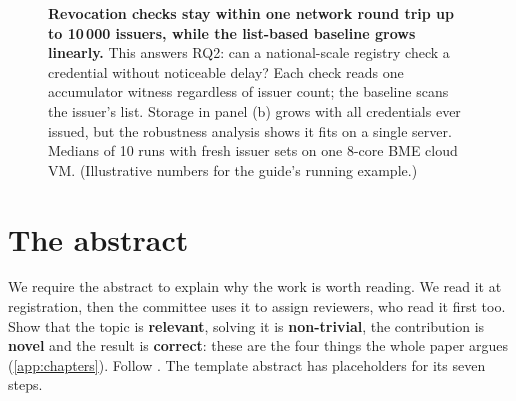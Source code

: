 \begin{figure}[!ht]
  \centering
  \caption{\textbf{Revocation checks stay within one network round trip up to 10\,000 issuers, while the list-based baseline grows linearly.} This answers RQ2: can a national-scale registry check a credential without noticeable delay? Each check reads one accumulator witness regardless of issuer count; the baseline scans the issuer's list. Storage in panel (b) grows with all credentials ever issued, but the robustness analysis shows it fits on a single server. Medians of 10 runs with fresh issuer sets on one 8-core BME cloud VM. (Illustrative numbers for the guide's running example.)}\label{fig:caption-example}
\end{figure}

\section{The abstract}\label{app:writing:abstract}
We require the abstract to explain why the work is worth reading. We read it at registration, then the committee uses it to assign reviewers, who read it first too. Show that the topic is \textbf{relevant}, solving it is \textbf{non-trivial}, the contribution is \textbf{novel} and the result is \textbf{correct}: these are the four things the whole paper argues (\cref{app:chapters}). Follow . The template abstract has placeholders for its seven steps.

